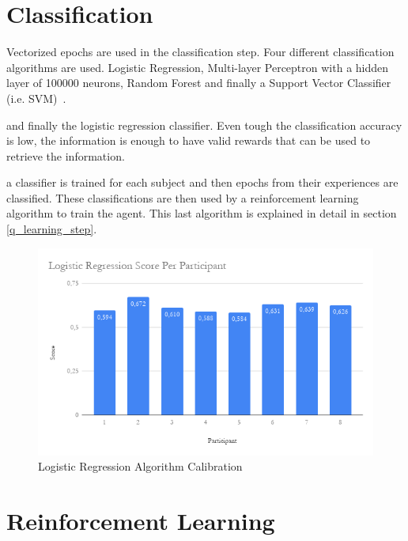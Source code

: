 \documentclass[journal]{IEEEtran}
\begin{document}
\section{Classification}

Vectorized epochs are used in the classification step.  Four different classification algorithms are used.  Logistic Regression, Multi-layer Perceptron with a hidden layer of 100000 neurons, Random Forest and finally a Support Vector Classifier (i.e. SVM)~\cite{Lotte2018}.  

and finally the logistic regression classifier.  Even tough the classification accuracy is low, the information is enough to have valid rewards that can be used to retrieve the information.

a classifier is trained for each subject and then epochs from their experiences are classified. These classifications are then used by a reinforcement learning algorithm to train the agent. This last algorithm is explained in detail in section \ref{q_learning_step}.

\begin{figure}[h]
    \centering
    \includegraphics[scale=0.4]{Images/algorithm_calibration/LR_calib.png}
    \caption{Logistic Regression Algorithm Calibration}
    \label{diag:algorithm_calibration:lr}
\end{figure}

\section{Reinforcement Learning}
\end{document}
